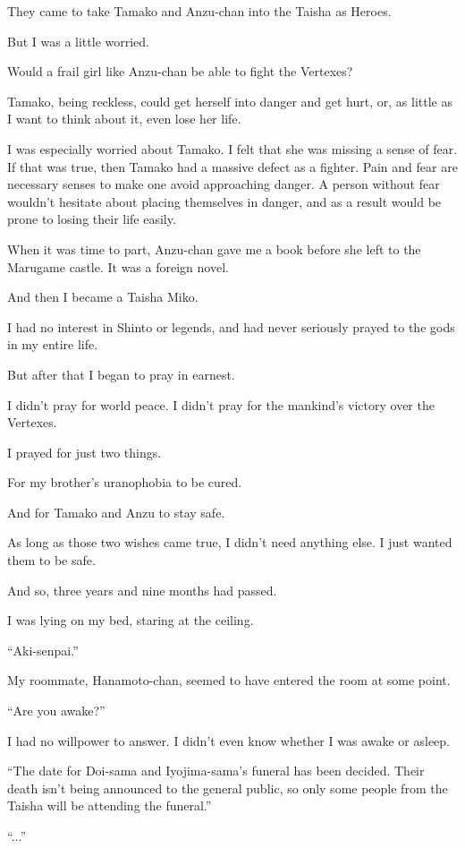 They came to take Tamako and Anzu-chan into the Taisha as Heroes.

But I was a little worried.

Would a frail girl like Anzu-chan be able to fight the Vertexes?

Tamako, being reckless, could get herself into danger and get hurt, or, as little as I want to think about it, even lose her life.

I was especially worried about Tamako. I felt that she was missing a sense of fear. If that was true, then Tamako had a massive defect as a fighter. Pain and fear are necessary senses to make one avoid approaching danger. A person without fear wouldn't hesitate about placing themselves in danger, and as a result would be prone to losing their life easily.

When it was time to part, Anzu-chan gave me a book before she left to the Marugame castle. It was a foreign novel.

And then I became a Taisha Miko.

I had no interest in Shinto or legends, and had never seriously prayed to the gods in my entire life.

But after that I began to pray in earnest.

I didn't pray for world peace. I didn't pray for the mankind's victory over the Vertexes.

I prayed for just two things.

For my brother's uranophobia to be cured.

And for Tamako and Anzu to stay safe.

As long as those two wishes came true, I didn't need anything else. I just wanted them to be safe.

And so, three years and nine months had passed.

I was lying on my bed, staring at the ceiling.

``Aki-senpai.''

My roommate, Hanamoto-chan, seemed to have entered the room at some point.

``Are you awake?''

I had no willpower to answer. I didn't even know whether I was awake or asleep.

``The date for Doi-sama and Iyojima-sama's funeral has been decided. Their death isn't being announced to the general public, so only some people from the Taisha will be attending the funeral.''

``...''

